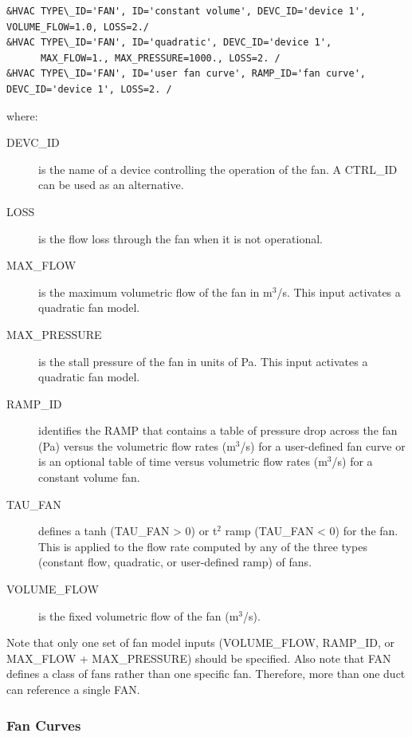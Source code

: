 \documentclass[11pt]{book}
\begin{document}
\begin{lstlisting}
&HVAC TYPE\_ID='FAN', ID='constant volume', DEVC_ID='device 1', VOLUME_FLOW=1.0, LOSS=2./
&HVAC TYPE\_ID='FAN', ID='quadratic', DEVC_ID='device 1',
      MAX_FLOW=1., MAX_PRESSURE=1000., LOSS=2. /
&HVAC TYPE\_ID='FAN', ID='user fan curve', RAMP_ID='fan curve',  DEVC_ID='device 1', LOSS=2. /
\end{lstlisting}

\noindent where:

\begin{description}
\item[{\ct DEVC\_ID}] is the name of a device controlling the operation of the fan. A {\ct CTRL\_ID} can be used as an alternative.
\item[{\ct LOSS}] is the flow loss through the fan when it is not operational.
\item[{\ct MAX\_FLOW}] is the maximum volumetric flow of the fan in m$^3$/s.  This input activates a quadratic fan model.
\item[{\ct MAX\_PRESSURE}] is the stall pressure of the fan in units of Pa.  This input activates a quadratic fan model.
\item[{\ct RAMP\_ID}] identifies the {\ct RAMP} that contains a table of pressure drop across the fan (Pa) versus the volumetric flow rates (m$^3$/s) for a user-defined fan curve or is an optional table of time versus volumetric flow rates (m$^3$/s) for a constant volume fan.
\item[{\ct TAU\_FAN}]  defines a tanh ({\ct TAU\_FAN} > 0) or t$^2$ ramp ({\ct TAU\_FAN} < 0) for the fan.  This is applied to the flow rate computed by any of the three types (constant flow, quadratic, or user-defined ramp) of fans.
\item[{\ct VOLUME\_FLOW}] is the fixed volumetric flow of the fan (m$^3$/s).
\end{description}

\noindent
Note that only one set of fan model inputs ({\ct VOLUME\_FLOW}, {\ct RAMP\_ID}, or {\ct MAX\_FLOW + MAX\_PRESSURE}) should be specified.
Also note that {\ct FAN} defines a class of fans rather than one specific fan. Therefore, more than one duct can reference a single {\ct FAN}.

\subsubsection{Fan Curves}
\label{info:Fan_Curves}
\end{document}
